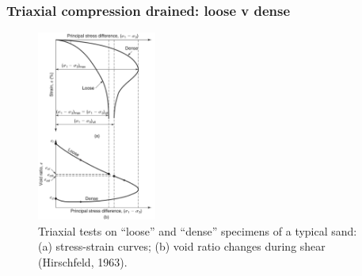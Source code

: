 \documentclass[notes]{beamer}
\begin{document}
\begin{frame}
\frametitle{Triaxial compression drained: loose v dense}
\begin{figure}
	\includegraphics[width=0.35\textwidth]{figs/tx-drained-loose-dense.png}
	\caption*{Triaxial tests on “loose” and “dense” specimens of a typical sand: (a) stress-strain curves; (b) void
		ratio changes during shear (Hirschfeld, 1963).}
\end{figure}
\end{frame}
\end{document}
